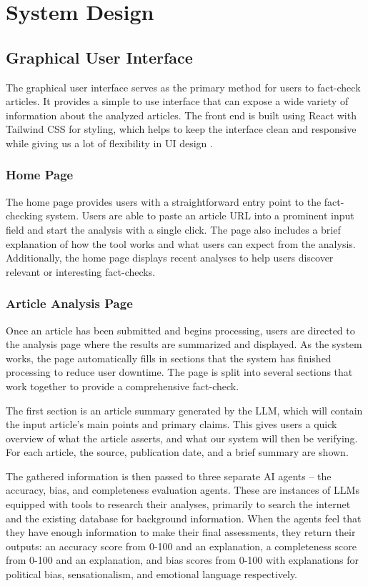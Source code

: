 \documentclass[conference]{IEEEtran}
\begin{document}
\section{System Design}
\subsection{Graphical User Interface}
The graphical user interface serves as the primary method for users to fact-check articles. It provides a simple to use interface that can expose a wide variety of information about the analyzed articles. The front end is built using React with Tailwind CSS for styling, which helps to keep the interface clean and responsive while giving us a lot of flexibility in UI design \cite{react, tailwind}.

\subsubsection{Home Page}
The home page provides users with a straightforward entry point to the fact-checking system. Users are able to paste an article URL into a prominent input field and start the analysis with a single click. The page also includes a brief explanation of how the tool works and what users can expect from the analysis. Additionally, the home page displays recent analyses to help users discover relevant or interesting fact-checks.

\subsubsection{Article Analysis Page}
Once an article has been submitted and begins processing, users are directed to the analysis page where the results are summarized and displayed. As the system works, the page automatically fills in sections that the system has finished processing to reduce user downtime. The page is split into several sections that work together to provide a comprehensive fact-check.

The first section is an article summary generated by the LLM, which will contain the input article's main points and primary claims. This gives users a quick overview of what the article asserts, and what our system will then be verifying. For each article, the source, publication date, and a brief summary are shown.

The gathered information is then passed to three separate AI agents -- the accuracy, bias, and completeness evaluation agents. These are instances of LLMs equipped with tools to research their analyses, primarily to search the internet and the existing database for background information. When the agents feel that they have enough information to make their final assessments, they return their outputs: an accuracy score from 0-100 and an explanation, a completeness score from 0-100 and an explanation, and bias scores from 0-100 with explanations for political bias, sensationalism, and emotional language respectively.
\end{document}
